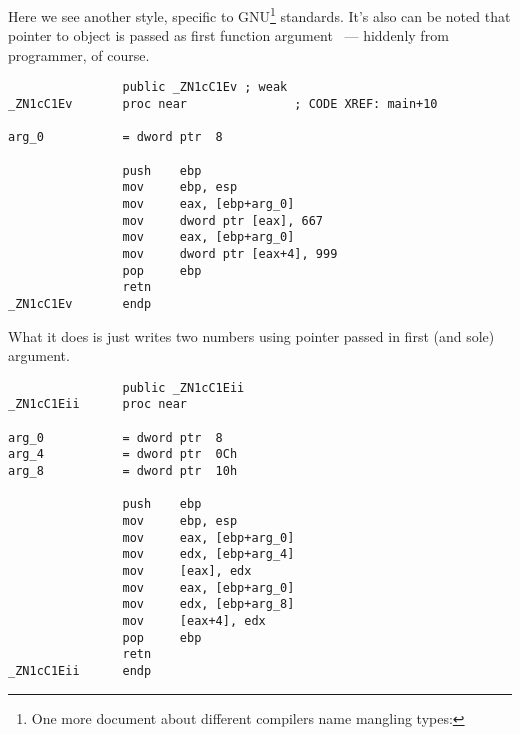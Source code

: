 {Here we see another  style, specific to GNU\footnote{One more document about different compilers name mangling types: \URLAGNER} standards. It's also can be noted that pointer to object is passed as first function argument ~--- hiddenly from programmer, of course.}


\begin{lstlisting}
                public _ZN1cC1Ev ; weak
_ZN1cC1Ev       proc near               ; CODE XREF: main+10

arg_0           = dword ptr  8

                push    ebp
                mov     ebp, esp
                mov     eax, [ebp+arg_0]
                mov     dword ptr [eax], 667
                mov     eax, [ebp+arg_0]
                mov     dword ptr [eax+4], 999
                pop     ebp
                retn
_ZN1cC1Ev       endp
\end{lstlisting}

{What it does is just writes two numbers using pointer passed in first (and sole) argument.}


\begin{lstlisting}
                public _ZN1cC1Eii
_ZN1cC1Eii      proc near

arg_0           = dword ptr  8
arg_4           = dword ptr  0Ch
arg_8           = dword ptr  10h

                push    ebp
                mov     ebp, esp
                mov     eax, [ebp+arg_0]
                mov     edx, [ebp+arg_4]
                mov     [eax], edx
                mov     eax, [ebp+arg_0]
                mov     edx, [ebp+arg_8]
                mov     [eax+4], edx
                pop     ebp
                retn
_ZN1cC1Eii      endp
\end{lstlisting}


